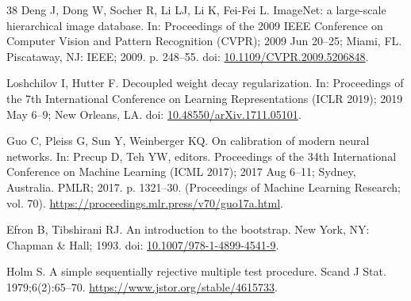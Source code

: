 \documentclass[12pt]{article}
\begin{document}
\begin{thebibliography}{38}
Deng J, Dong W, Socher R, Li LJ, Li K, Fei-Fei L. ImageNet: a large-scale hierarchical image database. In: Proceedings of the 2009 IEEE Conference on Computer Vision and Pattern Recognition (CVPR); 2009 Jun 20--25; Miami, FL. Piscataway, NJ: IEEE; 2009. p. 248--55. doi: \href{https://doi.org/10.1109/CVPR.2009.5206848}{10.1109/CVPR.2009.5206848}.

Loshchilov I, Hutter F. Decoupled weight decay regularization. In: Proceedings of the 7th International Conference on Learning Representations (ICLR 2019); 2019 May 6--9; New Orleans, LA. doi: \href{https://doi.org/10.48550/arXiv.1711.05101}{10.48550/arXiv.1711.05101}.

Guo C, Pleiss G, Sun Y, Weinberger KQ. On calibration of modern neural networks. In: Precup D, Teh YW, editors. Proceedings of the 34th International Conference on Machine Learning (ICML 2017); 2017 Aug 6--11; Sydney, Australia. PMLR; 2017. p. 1321--30. (Proceedings of Machine Learning Research; vol. 70). \url{https://proceedings.mlr.press/v70/guo17a.html}.

Efron B, Tibshirani RJ. An introduction to the bootstrap. New York, NY: Chapman \& Hall; 1993. doi: \href{https://doi.org/10.1007/978-1-4899-4541-9}{10.1007/978-1-4899-4541-9}.

Holm S. A simple sequentially rejective multiple test procedure. Scand J Stat. 1979;6(2):65--70. \url{https://www.jstor.org/stable/4615733}.
\end{thebibliography}
\end{document}
